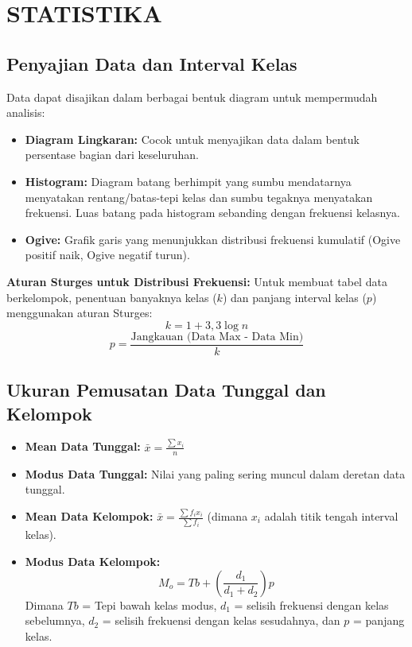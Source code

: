 \documentclass[12pt, a4paper]{article}
\begin{document}
\section{STATISTIKA}

\subsection{Penyajian Data dan Interval Kelas}
Data dapat disajikan dalam berbagai bentuk diagram untuk mempermudah analisis:
\begin{itemize}
    \item \textbf{Diagram Lingkaran:} Cocok untuk menyajikan data dalam bentuk persentase bagian dari keseluruhan.
    \item \textbf{Histogram:} Diagram batang berhimpit yang sumbu mendatarnya menyatakan rentang/batas-tepi kelas dan sumbu tegaknya menyatakan frekuensi. Luas batang pada histogram sebanding dengan frekuensi kelasnya.
    \item \textbf{Ogive:} Grafik garis yang menunjukkan distribusi frekuensi kumulatif (Ogive positif naik, Ogive negatif turun).
\end{itemize}
\textbf{Aturan Sturges untuk Distribusi Frekuensi:}
Untuk membuat tabel data berkelompok, penentuan banyaknya kelas ($k$) dan panjang interval kelas ($p$) menggunakan aturan Sturges:
\[ k = 1 + 3,3 \log n \] 
\[ p = \frac{\text{Jangkauan (Data Max - Data Min)}}{k} \] 

\subsection{Ukuran Pemusatan Data Tunggal dan Kelompok}
\begin{itemize}
    \item \textbf{Mean Data Tunggal:} $\bar{x} = \frac{\sum x_i}{n}$
    \item \textbf{Modus Data Tunggal:} Nilai yang paling sering muncul dalam deretan data tunggal.
    \item \textbf{Mean Data Kelompok:} $\bar{x} = \frac{\sum f_i x_i}{\sum f_i}$ (dimana $x_i$ adalah titik tengah interval kelas).
    \item \textbf{Modus Data Kelompok:} 
          \[ M_o = Tb + \left( \frac{d_1}{d_1 + d_2} \right) p \] 
          Dimana $Tb$ = Tepi bawah kelas modus, $d_1$ = selisih frekuensi dengan kelas sebelumnya, $d_2$ = selisih frekuensi dengan kelas sesudahnya, dan $p$ = panjang kelas.
\end{itemize}
\end{document}
